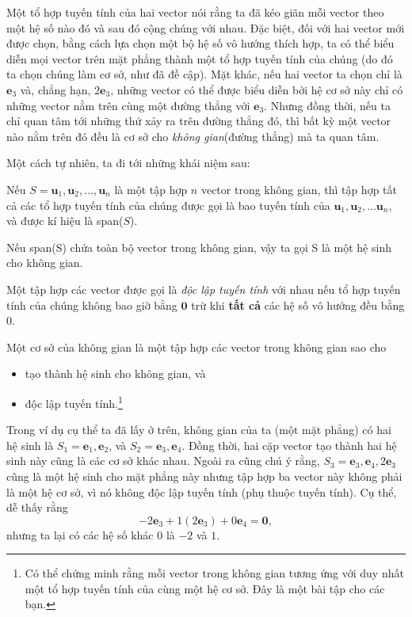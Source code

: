 Một tổ hợp tuyến tính của hai vector nói rằng ta đã kéo giãn mỗi vector theo một hệ số nào đó và sau đó cộng chúng với nhau. Đặc biệt, đối với hai vector mới được chọn, bằng cách lựa chọn một bộ hệ số vô hướng thích hợp, ta có thể biểu diễn mọi vector trên mặt phẳng thành một tổ hợp tuyến tính của chúng (do đó ta chọn chúng làm cơ sở, như đã đề cập). 
Mặt khác, nếu hai vector ta chọn chỉ là \(\mathbf{e}_3\) và, chẳng hạn, \(2\mathbf{e}_3\), những vector có thể được biểu diễn bởi hệ cơ sở này chỉ có những vector nằm trên cùng một đường thẳng với \(\mathbf{e}_3\). Nhưng đồng thời, nếu ta chỉ quan tâm tới 
những thứ xảy ra trên đường thẳng đó, thì bất kỳ một vector nào nằm trên đó đều là cơ sở cho \emph{không gian}(đường thẳng) mà ta quan tâm.
\vspace{8pt}

Một cách tự nhiên, ta đi tới những khái niệm sau:
\begin{definition}
    Nếu \(S={\mathbf{u}_{1}, \mathbf{u}_{2},\dots,  \mathbf{u}_{n}}\) là một tập hợp \(n\) vector trong không gian, thì tập hợp tất cả các tổ hợp tuyến tính của chúng được gọi là bao tuyến tính của \(\mathbf{u}_{1}, \mathbf{u}_{2},\dots \mathbf{u}_{n}\), và được kí hiệu là span(\(S\)).
    \vspace{8pt}

    Nếu span(S) chứa toàn bộ vector trong không gian, vậy ta gọi S là một hệ sinh cho không gian.
\end{definition}

\begin{definition}
    Một tập hợp các vector được gọi là \emph{độc lập tuyến tính} với nhau nếu tổ hợp tuyến tính của chúng không bao giờ bằng \(\mathbf{0}\) trừ khi \textbf{tất cả} các hệ số vô hướng đều bằng \(0\).
\end{definition}
\begin{definition}[Hệ cơ sở]
    Một cơ sở của không gian là một tập hợp các vector trong không gian sao cho 
    \begin{itemize}
        \item tạo thành hệ sinh cho không gian, và
        \item độc lập tuyến tính.\footnote{Có thể chứng minh rằng mỗi vector trong không gian tương ứng với duy nhất một tổ hợp tuyến tính của cùng một hệ cơ sở. Đây là một bài tập cho các bạn.}
    \end{itemize}
\end{definition}
Trong ví dụ cụ thể ta đã lấy ở trên, không gian của ta (một mặt phẳng) có hai hệ sinh là \(S_1 ={\mathbf{e}_{1}, \mathbf{e}_2}\), và \(S_2 ={\mathbf{e}_{3}, \mathbf{e}_{4}}\). Đồng thời, hai cặp vector tạo thành hai hệ sinh này cũng là các cơ sở khác nhau. Ngoài ra cũng chú ý rằng, \(S_{3}={\mathbf{e}_{3}, \mathbf{e}_{4}, 2\mathbf{e}_{3}}\) cũng là một hệ sinh cho mặt phẳng này nhưng tập hợp ba vector này không phải là một hệ cơ sở, vì nó không độc lập tuyến tính (phụ thuộc tuyến tính). Cụ thể, dễ thấy rằng \[-2\mathbf{e}_{3}+1(2\mathbf{e}_{3})+0\mathbf{e}_{4}=\mathbf{0},\] nhưng ta lại có các hệ số khác \(0\) là \(-2\) và \(1\).

